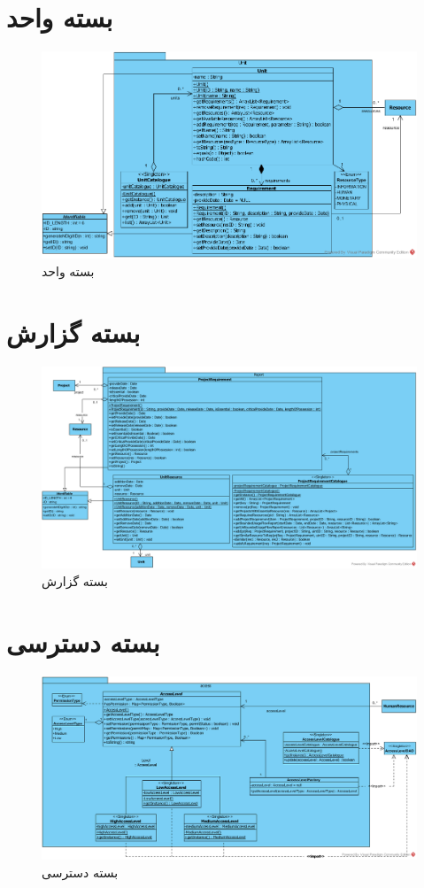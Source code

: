 \begin{landscape}
	
	\section{بسته واحد}
	\begin{figure}[H]
		\centering
		\includegraphics[scale=0.6]{img/class-design/UnitPackage}
		\caption{بسته واحد}
	\end{figure}
	
	\section{بسته گزارش}
	\begin{figure}[H]
		\centering
		\includegraphics[scale=0.45]{img/class-design/ReportPackage}
		\caption{بسته گزارش}
	\end{figure}
	
	\section{بسته دسترسی}
	\begin{figure}[H]
		\centering
		\includegraphics[scale=0.6]{img/class-design/AccessPackage}
		\caption{بسته دسترسی}
	\end{figure}
	

\end{landscape}
